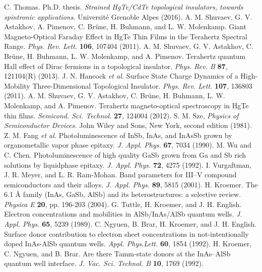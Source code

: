 \documentclass[titlepage,a4paper]{book}
\begin{document}
\begin{thebibliography}{199}
C. Thomas. Ph.D. thesis. \textit{Strained HgTe/CdTe topological insulators, towards spintronic applications}. Université Grenoble Alpes (2016).  
A. M. Shuvaev, G. V. Astakhov, A. Pimenov, C. Brüne, H. Buhmann, and L. W. Molenkamp. Giant Magneto-Optical Faraday Effect in HgTe Thin Films in the Terahertz Spectral Range. \textit{Phys. Rev. Lett.} \textbf{106}, 107404 (2011).
A. M. Shuvaev, G. V. Astakhov, C. Brüne, H. Buhmann, L. W. Molenkamp, and A. Pimenov. Terahertz quantum Hall effect of Dirac fermions in a topological insulator. \textit{Phys. Rev. B} \textbf{87}, 121104(R) (2013).
J. N. Hancock \textit{et al.} Surface State Charge Dynamics of a High-Mobility Three-Dimensional Topological Insulator. \textit{Phys. Rev. Lett.} \textbf{107}, 136803 (2011).
A. M. Shuvaev, G. V. Astakhov, C. Brüne, H. Buhmann, L. W. Molenkamp, and A. Pimenov. Terahertz magneto-optical spectroscopy in HgTe thin films. \textit{Semicond. Sci. Technol.} \textbf{27}, 124004 (2012).
S. M. Sze, \textit{Physics of Semiconductor Devices.} John Wiley and Sons, New York, second edition (1981).
Z. M. Fang \textit{et al.} Photoluminescence of InSb, InAs, and InAsSb grown by organometallic vapor phase epitaxy. \textit{J. Appl. Phys.} \textbf{67}, 7034 (1990).
M. Wu and C. Chen. Photoluminescence of high quality GaSb grown from Ga and Sb rich solutions by liquidphase epitaxy. \textit{J. Appl. Phys.} \textbf{72}, 4275 (1992).
I. Vurgaftman, J. R. Meyer, and L. R. Ram-Mohan. Band parameters for III–V compound semiconductors and their alloys. \textit{J. Appl. Phys.} \textbf{89}, 5815 (2001).
H. Kroemer. The 6.1 Å family (InAs, GaSb, AlSb) and its heterostructures: a selective review. \textit{Physica E} \textbf{20}, pp. 196-203 (2004). 
G. Tuttle, H. Kroemer, and J. H. English. Electron concentrations and mobilities in AlSb/InAs/AlSb quantum wells. \textit{J. Appl. Phys.} \textbf{65}, 5239 (1989).
C. Ngyuen, B. Brar, H. Kroemer, and J. H. English. Surface donor contribution to electron sheet concentrations in not-intentionally doped InAs-AlSb quantum wells. \textit{Appl. Phys.Lett.} \textbf{60}, 1854 (1992).
H. Kroemer, C. Ngyuen, and B. Brar. Are there Tamm-state donors at the InAs–AlSb quantum well interface. \textit{J. Vac. Sci. Technol. B} \textbf{10}, 1769 (1992). 

\end{thebibliography}
\end{document}
